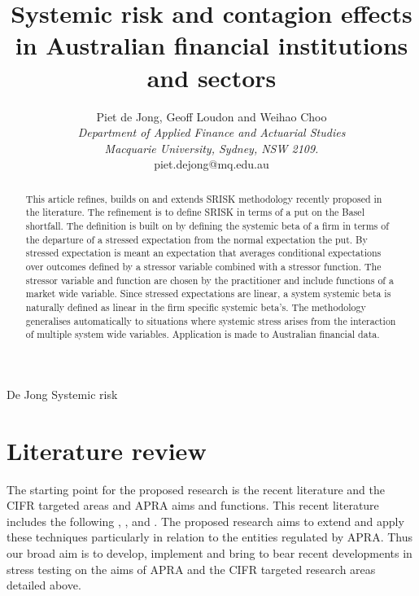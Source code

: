 \documentclass[authoryear]{elsarticle}
\begin{document}
\title{Systemic risk and contagion effects in Australian financial institutions and sectors}
\author{Piet de Jong,  Geoff Loudon and Weihao Choo \\[4pt]
\textit{Department of Applied Finance and Actuarial Studies\\ Macquarie University, Sydney, NSW 2109.}
\\[2pt]
{piet.dejong@mq.edu.au}}

\markboth%
{De Jong}
{Systemic risk}

\begin{abstract}
This article refines, builds on and extends  SRISK methodology recently proposed in the literature.  The refinement is to define SRISK in terms of a put on the Basel shortfall.   The definition is built on by defining the systemic beta of a firm in terms of the departure of a stressed expectation from the normal expectation the put.  By stressed expectation is meant an expectation that averages conditional expectations over outcomes defined by a stressor variable combined with  a stressor function.  The stressor variable and function are chosen by the practitioner and include functions of a  market wide variable. Since stressed expectations are linear, a system systemic beta is naturally defined as linear in the firm specific systemic beta's.    The methodology  generalises automatically to situations where systemic stress arises from the interaction of multiple system wide variables.    Application is made to Australian financial data. 
\end{abstract}

\maketitle

\section{Literature review}

The starting point for the proposed research is the recent literature and the CIFR targeted areas and APRA aims and functions.
This recent literature includes the following
\cite{adrian2011covar},
\cite{acharya2012capital},
\cite{acharya2012measuring}
and \cite{brownlees2010volatility}.   The proposed research aims to extend and apply these techniques particularly in relation to the entities regulated by APRA.   Thus our  broad aim is to develop, implement and bring to bear recent developments in stress testing  on the aims of APRA and the CIFR targeted research areas detailed above.   
\end{document}
